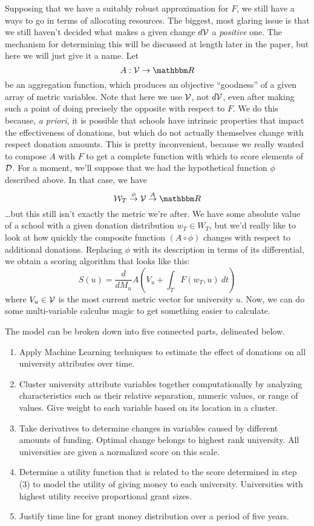 \documentclass[paper.tex]{subfiles}
\begin{document}
	Supposing that we have a suitably robust approximation for $F$, we still have a ways to go in terms of allocating resources. The biggest, most glaring issue is that we still haven't decided what makes a given change $d\mathcal{V}$ a \emph{positive} one. The mechanism for determining this will be discussed at length later in the paper, but here we will just give it a name. Let
	\begin{equation}
		A : \V \to \Re
	\end{equation}
	be an aggregation function, which produces an objective ``goodness'' of a given array of metric variables. Note that here we use $\mathcal{V}$, not $d\mathcal{V}$, even after making such a point of doing precisely the opposite with respect to $F$. We do this because, \emph{a priori}, it is possible that schools have intrinsic properties that impact the effectiveness of donations, but which do not actually themselves change with respect donation amounts. This is pretty inconvenient, because we really wanted to compose $A$ with $F$ to get a complete function with which to score elements of $\mathcal{D}$. For a moment, we'll suppose that we had the hypothetical function $\phi$ described above. In that case, we have
	\[ \W_T \overset{\phi}{\to} \V \overset{A}{\to} \Re \] 
	\ldots but this still isn't exactly the metric we're after. We have some absolute value of a school with a given donation distribution $w_T \in W_T$, but we'd really like to look at how quickly the composite function $(A \circ \phi)$ changes with respect to additional donations. Replacing $\phi$ with its description in terms of its differential, we obtain a scoring algorithm that looks like this:
	\begin{equation}
		S(u) =  \frac{d}{dM_u} A\left(V_u + \int_{T} F(w_T, u)~dt\right)
	\end{equation}
	where $V_u \in \mathcal{V}$ is the most current metric vector for university $u$. Now, we can do some multi-variable calculus magic to get something easier to calculate.

The model can be broken down into five connected parts, delineated below.
	\begin{enumerate}
		\item Apply Machine Learning techniques to estimate the effect of donations on all university attributes over time.
		\item Cluster university attribute variables together computationally by analyzing characteristics such as their relative separation, numeric values, or range of values. Give weight to each variable based on its location in a cluster.
		\item Take derivatives to determine changes in variables caused by different amounts of funding. Optimal change belongs to highest rank university. All universities are given a normalized score on this scale.
		\item Determine a utility function that is related to the score determined in step (3) to model the utility of giving money to each university. Universities with highest utility receive proportional grant sizes.
		\item Justify time line for grant money distribution over a period of five years.
	\end{enumerate}
	
	
\end{document}
